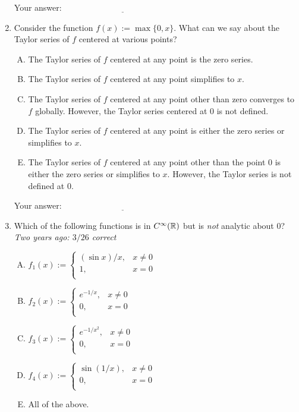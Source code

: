 \documentclass[10pt]{amsart}
\begin{document}
\begin{enumerate}
  \vspace{0.05in}
  Your answer: $\underline{\qquad\qquad\qquad\qquad\qquad\qquad\qquad}$
  \vspace{0.05in}

\item Consider the function $f(x) := \max \{ 0, x\}$. What can we say
  about the Taylor series of $f$ centered at various points?

  \begin{enumerate}[(A)]
  \item The Taylor series of $f$ centered at any point is the zero
    series.
  \item The Taylor series of $f$ centered at any point simplifies to
  $x$.
  \item The Taylor series of $f$ centered at any point other than zero
    converges to $f$ globally. However, the Taylor series centered at
    $0$ is not defined.
  \item The Taylor series of $f$ centered at any point is either the
    zero series or simplifies to $x$.
  \item The Taylor series of $f$ centered at any point other than the
    point $0$ is either the zero series or simplifies to $x$. However,
    the Taylor series is not defined at $0$.
  \end{enumerate}

  \vspace{0.05in}
  Your answer: $\underline{\qquad\qquad\qquad\qquad\qquad\qquad\qquad}$
  \vspace{0.05in}

\item Which of the following functions is in $C^\infty(\mathbb{R})$ but is
  {\em not} analytic about $0$? {\em Two years ago: $3/26$ correct}

  \begin{enumerate}[(A)]
  \item $f_1(x) := \left \lbrace \begin{array}{rl} (\sin x)/x, & x \ne 0\\ 1, & x = 0 \\\end{array} \right.$
  \item $f_2(x) := \left \lbrace \begin{array}{rl} e^{-1/x}, & x \ne 0\\ 0, & x = 0 \\\end{array} \right.$
  \item $f_3(x) := \left \lbrace \begin{array}{rl} e^{-1/x^2}, & x \ne 0\\ 0, & x = 0 \\\end{array} \right.$
  \item $f_4(x) := \left \lbrace \begin{array}{rl} \sin(1/x), & x \ne 0 \\ 0, & x = 0 \\\end{array} \right.$
  \item All of the above.
  \end{enumerate}


\end{enumerate}
\end{document}
